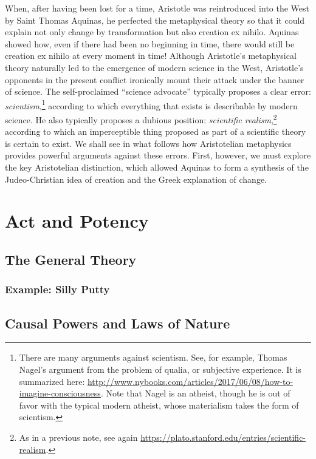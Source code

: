 \documentclass[twocolumn]{article}
\begin{document}
When, after having been lost for a time, Aristotle was reintroduced into the
West by Saint Thomas Aquinas, he perfected the metaphysical theory so that it
could explain not only change by transformation but also creation ex nihilo.
Aquinas showed how, even if there had been no beginning in time, there would
still be creation ex nihilo at every moment in time!  Although Aristotle's
metaphysical theory naturally led to the emergence of modern science in the
West, Aristotle's opponents in the present conflict ironically mount their
attack under the banner of science.  The self-proclaimed ``science advocate''
typically proposes a clear error: \emph{scientism},\footnote{%
   There are many arguments against scientism.  See, for example, Thomas
   Nagel's argument from the problem of qualia, or subjective experience. It is
   summarized here:
   \url{http://www.nybooks.com/articles/2017/06/08/how-to-imagine-consciousness}.
   Note that Nagel is an atheist, though he is out of favor with the typical
   modern atheist, whose materialism takes the form of scientism.%
}
according to which everything that exists is describable by modern science. He
also typically proposes a dubious position: \emph{scientific
realism},\footnote{%
   As in a previous note, see again
   \url{https://plato.stanford.edu/entries/scientific-realism}.
}
according to which an imperceptible thing proposed as part of a scientific
theory is certain to exist.  We shall see in what follows how Aristotelian
metaphysics provides powerful arguments against these errors.  First, however,
we must explore the key Aristotelian distinction, which allowed Aquinas to form
a synthesis of the Judeo-Christian idea of creation and the Greek explanation
of change.

\section{Act and Potency}

\subsection{The General Theory}

\subsubsection{Example: Silly Putty}

\subsection{Causal Powers and Laws of Nature}
\end{document}

